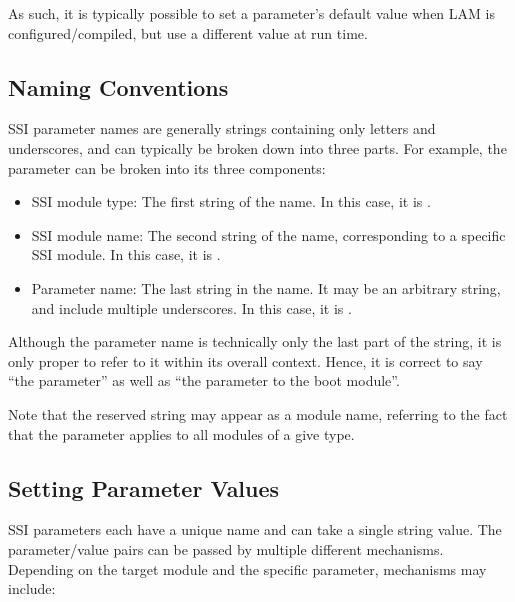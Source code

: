 As such, it is typically possible to set a parameter's default value
when LAM is configured/compiled, but use a different value at run
time.


\subsection{Naming Conventions}

SSI parameter names are generally strings containing only letters and
underscores, and can typically be broken down into three parts.  For
example, the parameter  can be broken
into its three components:

\begin{itemize}
\item SSI module type: The first string of the name.  In this case, it
  is .

\item SSI module name: The second string of the name, corresponding to
  a specific SSI module.  In this case, it is .
  
\item Parameter name: The last string in the name.  It may be an
  arbitrary string, and include multiple underscores.  In this case,
  it is .
\end{itemize}

Although the parameter name is technically only the last part of the
string, it is only proper to refer to it within its overall context.
Hence, it is correct to say ``the 
parameter'' as well as ``the  parameter to the
 boot module''.

Note that the reserved string  may appear as a module
name, referring to the fact that the parameter applies to all modules
of a give type.


\subsection{Setting Parameter Values}

SSI parameters each have a unique name and can take a single string
value.  The parameter/value pairs can be passed by multiple different
mechanisms.  Depending on the target module and the specific
parameter, mechanisms may include:

